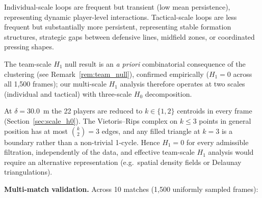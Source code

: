 Individual-scale loops are frequent but transient (low mean persistence), representing dynamic player-level interactions. Tactical-scale loops are less frequent but substantially more persistent, representing stable formation structures, strategic gaps between defensive lines, midfield zones, or coordinated pressing shapes.

The team-scale \(H_1\) null result is an \emph{a priori} combinatorial consequence of the clustering (see Remark~\ref{rem:team_null}), confirmed empirically (\(H_1=0\) across all 1,500 frames); our multi-scale \(H_1\) analysis therefore operates at two scales (individual and tactical) with three-scale \(H_0\) decomposition.

\begin{remark}\label{rem:team_null}
At \(\delta=30.0\)~m the 22 players are reduced to \(k\in\{1,2\}\) centroids in every frame (Section~\ref{sec:scale_h0}). The Vietoris--Rips complex on \(k\leq 3\) points in general position has at most \(\binom{k}{2}=3\) edges, and any filled triangle at \(k=3\) is a boundary rather than a non-trivial 1-cycle. Hence \(H_1=0\) for every admissible filtration, independently of the data, and effective team-scale \(H_1\) analysis would require an alternative representation (e.g.\ spatial density fields or Delaunay triangulations).
\end{remark}

\textbf{Multi-match validation.} Across 10 matches (1,500 uniformly sampled frames):

\begin{table}[H]
  \centering
  \caption{Multi-match \(H_1\) statistics (10 matches). Presence rates are given with 95\% bootstrap CIs (1{,}000 resamples over matches).}
  \label{tab:h1multi}
\end{table}

